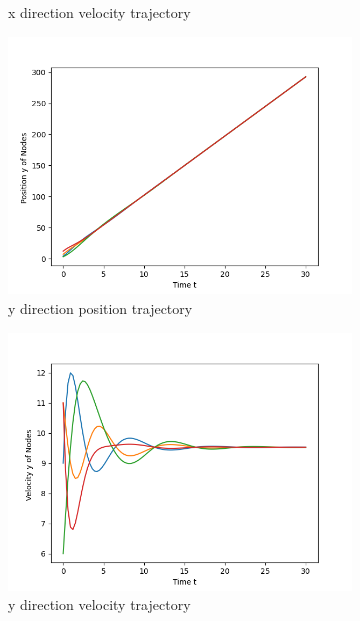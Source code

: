 \documentclass{article}
\begin{document}
\begin{problem}
\begin{figure}[!h]
\begin{subfigure}{0.35\textwidth}
            \caption{x direction velocity trajectory}
        \end{subfigure}
        \begin{subfigure}{0.35\textwidth}
            \includegraphics[width=\textwidth]{./img/p1_3.png}
            \caption{y direction position trajectory}
        \end{subfigure}
        \begin{subfigure}{0.35\textwidth}
            \includegraphics[width=\textwidth]{./img/p1_4.png}
            \caption{y direction velocity trajectory}
        \end{subfigure}
        \begin{subfigure}{0.35\textwidth}

\end{subfigure}
\end{figure}
\end{problem}
\end{document}
